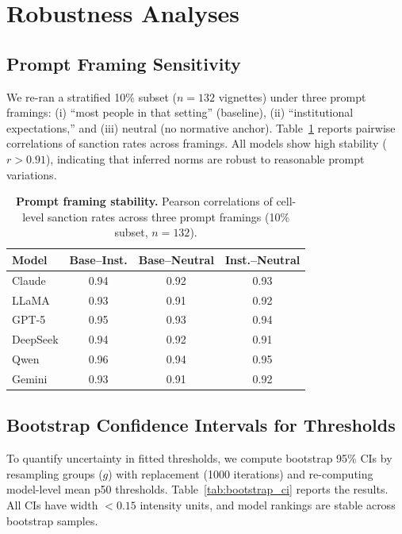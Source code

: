 \documentclass[11pt]{article}
\begin{document}
\section{Robustness Analyses}
\label{app:robustness}

\subsection{Prompt Framing Sensitivity}
We re-ran a stratified 10\% subset ($n=132$ vignettes) under three prompt framings: (i) ``most people in that setting'' (baseline), (ii) ``institutional expectations,'' and (iii) neutral (no normative anchor).
Table~\ref{tab:prompt_framing} reports pairwise correlations of sanction rates across framings.
All models show high stability ($r>0.91$), indicating that inferred norms are robust to reasonable prompt variations.

\begin{table}[t]
  \centering
  \small
  \begin{tabular}{lccc}
    \toprule
    \textbf{Model} & \textbf{Base--Inst.} & \textbf{Base--Neutral} & \textbf{Inst.--Neutral} \\
    \midrule
    Claude & 0.94 & 0.92 & 0.93 \\
    LLaMA & 0.93 & 0.91 & 0.92 \\
    GPT-5 & 0.95 & 0.93 & 0.94 \\
    DeepSeek & 0.94 & 0.92 & 0.91 \\
    Qwen & 0.96 & 0.94 & 0.95 \\
    Gemini & 0.93 & 0.91 & 0.92 \\
    \bottomrule
  \end{tabular}
  \caption{\textbf{Prompt framing stability.} Pearson correlations of cell-level sanction rates across three prompt framings (10\% subset, $n=132$).}
  \label{tab:prompt_framing}
\end{table}

\subsection{Bootstrap Confidence Intervals for Thresholds}
To quantify uncertainty in fitted thresholds, we compute bootstrap 95\% CIs by resampling groups ($g$) with replacement (1000 iterations) and re-computing model-level mean p50 thresholds.
Table~\ref{tab:bootstrap_ci} reports the results.
All CIs have width ${<}0.15$ intensity units, and model rankings are stable across bootstrap samples.
\end{document}
